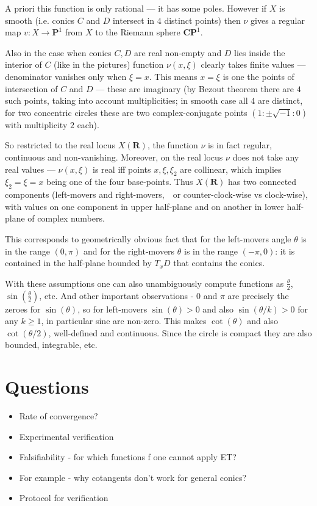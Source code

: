 \documentclass[12pt]{article}
\numberwithin{equation}{section}
\renewcommand\C{\mathbf{C}}                  %
\renewcommand\P{\mathbf{P}}                  %
\newcommand\R{\mathbf{R}}                    %
\begin{document}
A priori this function is only rational --- it has some poles.
However if $X$ is smooth (i.e. conics $C$ and $D$ intersect in $4$ distinct points)
then $ν$ gives a regular map $v: X\to \P^1$ from $X$ to the Riemann sphere $\C\P^1$.

Also in the case when conics $C,D$ are real non-empty and $D$ lies inside the interior of $C$ (like in the pictures)
function $ν(x,ξ)$ clearly takes finite values --- denominator vanishes only when $ξ=x$.
This means $x=ξ$ is one the points of intersection of $C$ and $D$ --- 
these are imaginary 
(by Bezout theorem there are $4$ such points, taking into account multiplicities; 
in smooth case all $4$ are distinct, 
for two concentric circles 
these are two complex-conjugate points 
$(1:\pm\sqrt{-1}:0)$ 
with multiplicity $2$ each).

So restricted to the real locus $X(\R)$, the function $ν$ is in fact regular, continuous and non-vanishing.
Moreover, on the real locus $ν$ does not take any real values --- $ν(x,ξ)$ is real 
iff points $x,ξ,ξ_2$ are collinear, which implies $ξ_2=ξ=x$ being one of the four base-points.
Thus $X(\R)$ has two connected components (left-movers and right-movers,  or counter-clock-wise vs clock-wise),
with values on one component in upper half-plane and on another in lower half-plane of complex numbers.

This corresponds to geometrically obvious fact 
that for the left-movers angle $θ$ is in the range $(0,π)$ 
and for the right-movers $θ$ is in the range $(-π,0)$:
it is contained in the half-plane bounded by $T_x D$ that contains the conics.

With these assumptions one can also unambiguously compute functions as $\frac{θ}2$,  $\sin(\frac{θ}2)$, etc.
And other important observations - $0$ and $π$ are precisely the zeroes for $\sin(θ)$,
so for left-movers $\sin(θ) > 0$ and also $\sin(θ/k) > 0$ for any $k\geq1$, in particular sine are non-zero.
This makes $\cot(θ)$ and also $\cot(θ/2)$, well-defined and continuous. 
Since the circle is compact they are also bounded, integrable, etc.

\section{Questions}

\begin{itemize}
\item Rate of convergence?
\item Experimental verification
\item Falsifiability - for which functions f one cannot apply ET?
\item For example - why cotangents don't work for general conics?
\item Protocol for verification
\end{itemize}
\end{document}
